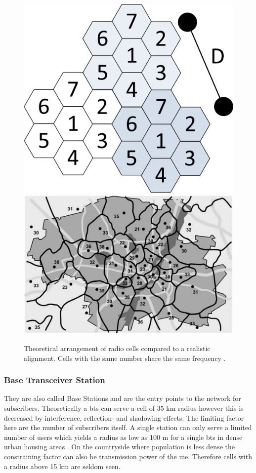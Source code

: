 \begin{figure}
\centering
\includegraphics{../Images/Cells}
\hspace{1cm}
\includegraphics[scale=.21]{../Images/real_Cells}
\caption{Theoretical arrangement of radio cells compared to a realistic alignment. Cells with the same number share the same frequency \cite{GSM2009}.}
\label{fig:cells}
\end{figure}

\subsubsection{Base Transceiver Station}
They are also called Base Stations and are the entry points to the network for subscribers.
Theoretically a \gls{bts} can serve a cell of 35 km radius however this is decreased by interference, reflection- and shadowing effects.
The limiting factor here are the number of subscribers itself.
A single station can only serve a limited number of users which yields a radius as low as 100 m for a single \gls{bts} in dense urban housing areas \cite{kommsys2006}.
On the countryside where population is less dense the constraining factor can also be transmission power of the \gls{me}.
Therefore cells with a radius above 15 km are seldom seen.

